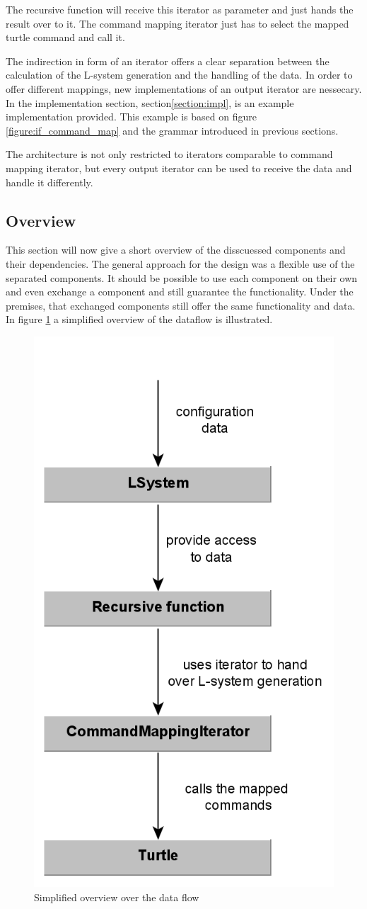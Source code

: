 \documentclass[english]{cpp-hmwk}
\begin{document}
The recursive function will receive this iterator as parameter and just hands the result over to it. The command mapping iterator just has to select the mapped turtle command and call it.

The indirection in form of an iterator offers a clear separation between the calculation of the L-system generation and the handling of the data. In order to offer different mappings, new implementations of an output iterator are nessecary. In the implementation section, section\ref{section:impl}, is an example implementation provided. This example is based on figure \ref{figure:if_command_map} and the grammar introduced in previous sections.

The architecture is not only restricted to iterators comparable to command mapping iterator, but every output iterator can be used to receive the data and handle it differently.

\subsection{Overview}
This section will now give a short overview of the disscuessed components and their dependencies. The general approach for the design was a flexible use of the separated components. It should be possible to use each component on their own and even exchange a component and still guarantee the functionality. Under the premises, that exchanged components still offer the same functionality and data. In figure \ref{figure:overview} a simplified overview of the dataflow is illustrated. 

\begin{figure}[h!]
	\centering
	\includegraphics[width=0.4\columnwidth]{../graphs/overview.png}
	\caption{Simplified overview over the data flow}
	\label{figure:overview}
\end{figure}
\end{document}
